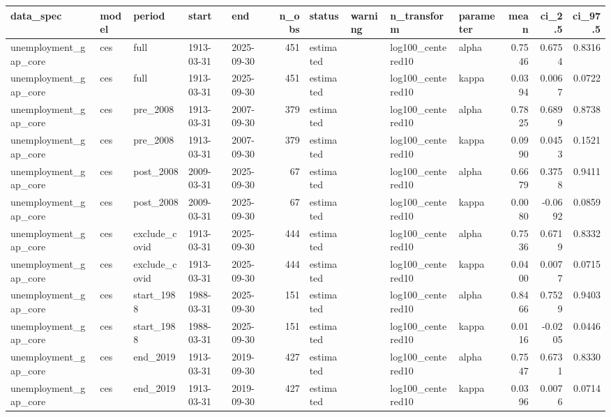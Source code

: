 \begin{tabular}{lllllrllllrrr}
\toprule
data\_spec & model & period & start & end & n\_obs & status & warning & n\_transform & parameter & mean & ci\_2.5 & ci\_97.5 \\
\midrule
unemployment\_gap\_core & ces & full & 1913-03-31 & 2025-09-30 & 451 & estimated &  & log100\_centered10 & alpha & 0.7546 & 0.6754 & 0.8316 \\
unemployment\_gap\_core & ces & full & 1913-03-31 & 2025-09-30 & 451 & estimated &  & log100\_centered10 & kappa & 0.0394 & 0.0067 & 0.0722 \\
unemployment\_gap\_core & ces & pre\_2008 & 1913-03-31 & 2007-09-30 & 379 & estimated &  & log100\_centered10 & alpha & 0.7825 & 0.6899 & 0.8738 \\
unemployment\_gap\_core & ces & pre\_2008 & 1913-03-31 & 2007-09-30 & 379 & estimated &  & log100\_centered10 & kappa & 0.0990 & 0.0453 & 0.1521 \\
unemployment\_gap\_core & ces & post\_2008 & 2009-03-31 & 2025-09-30 & 67 & estimated &  & log100\_centered10 & alpha & 0.6679 & 0.3758 & 0.9411 \\
unemployment\_gap\_core & ces & post\_2008 & 2009-03-31 & 2025-09-30 & 67 & estimated &  & log100\_centered10 & kappa & 0.0080 & -0.0692 & 0.0859 \\
unemployment\_gap\_core & ces & exclude\_covid & 1913-03-31 & 2025-09-30 & 444 & estimated &  & log100\_centered10 & alpha & 0.7536 & 0.6719 & 0.8332 \\
unemployment\_gap\_core & ces & exclude\_covid & 1913-03-31 & 2025-09-30 & 444 & estimated &  & log100\_centered10 & kappa & 0.0400 & 0.0077 & 0.0715 \\
unemployment\_gap\_core & ces & start\_1988 & 1988-03-31 & 2025-09-30 & 151 & estimated &  & log100\_centered10 & alpha & 0.8466 & 0.7529 & 0.9403 \\
unemployment\_gap\_core & ces & start\_1988 & 1988-03-31 & 2025-09-30 & 151 & estimated &  & log100\_centered10 & kappa & 0.0116 & -0.0205 & 0.0446 \\
unemployment\_gap\_core & ces & end\_2019 & 1913-03-31 & 2019-09-30 & 427 & estimated &  & log100\_centered10 & alpha & 0.7547 & 0.6731 & 0.8330 \\
unemployment\_gap\_core & ces & end\_2019 & 1913-03-31 & 2019-09-30 & 427 & estimated &  & log100\_centered10 & kappa & 0.0396 & 0.0076 & 0.0714 \\
\bottomrule
\end{tabular}

